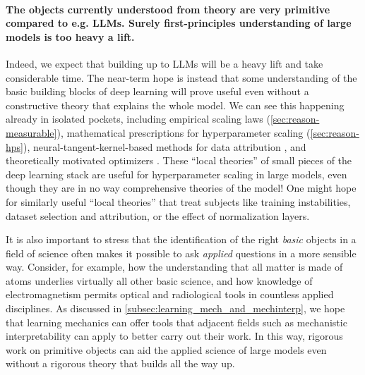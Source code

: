 \paragraph{The objects currently understood from theory are very primitive compared to e.g. LLMs. Surely first-principles understanding of large models is too heavy a lift.}
Indeed, we expect that building up to LLMs will be a heavy lift and take considerable time.
The near-term hope is instead that some understanding of the basic building blocks of deep learning will prove useful even without a constructive theory that explains the whole model.
We can see this happening already in isolated pockets, including empirical scaling laws (\cref{sec:reason-measurable}), mathematical prescriptions for hyperparameter scaling (\cref{sec:reason-hps}), neural-tangent-kernel-based methods for data attribution \citep{park:2023-trak}, and theoretically motivated optimizers \citep{gupta2018shampoo,jordan2024muon}.
These ``local theories'' of small pieces of the deep learning stack are useful for hyperparameter scaling in large models, even though they are in no way comprehensive theories of the model!
One might hope for similarly useful ``local theories'' that treat subjects like training instabilities, dataset selection and attribution, or the effect of normalization layers.

It is also important to stress that the identification of the right \textit{basic} objects in a field of science often makes it possible to ask \textit{applied} questions in a more sensible way.
Consider, for example, how the understanding that all matter is made of atoms underlies virtually all other basic science, and how knowledge of electromagnetism permits optical and radiological tools in countless applied disciplines.
As discussed in \cref{subsec:learning_mech_and_mechinterp}, we hope that learning mechanics can offer tools that adjacent fields such as mechanistic interpretability can apply to better carry out their work.
In this way, rigorous work on primitive objects can aid the applied science of large models even without a rigorous theory that builds all the way up.





